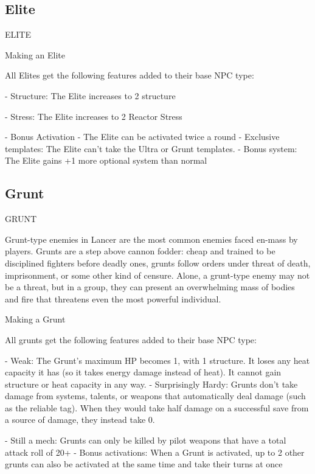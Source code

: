 \subsection{Elite}
                                                   ELITE  

Making an Elite
 
All Elites get the following features added to their base NPC type:
 
    -   Structure: The Elite increases to 2 structure
 
    -   Stress: The Elite increases to 2 Reactor Stress
 
    -    Bonus Activation - The Elite can be activated twice a round  
    -    Exclusive templates: The Elite can’t take the Ultra or Grunt templates.  
    -    Bonus system: The Elite gains +1 more optional system than normal  
\subsection{Grunt}
                                                 GRUNT   

Grunt-type enemies in Lancer are the most common enemies faced en-mass by players. Grunts  
are a step above cannon fodder: cheap and trained to be disciplined fighters before deadly ones,  
grunts follow orders under threat of death, imprisonment, or some other kind of censure. Alone, a  
grunt-type enemy may not be a threat, but in a group, they can present an overwhelming mass of  
bodies and fire that threatens even the most powerful individual.   

Making a Grunt
 
All grunts get the following features added to their base NPC type:
 
    -   Weak: The Grunt’s maximum HP becomes 1, with 1 structure. It loses any heat capacity it  
         has (so it takes energy damage instead of heat). It cannot gain structure or heat capacity  
         in any way.  
    -   Surprisingly Hardy: Grunts don’t take damage from systems, talents, or weapons that  
        automatically deal damage (such as the reliable tag). When they would take half damage  
        on a successful save from a source of damage, they instead take 0.
 
    -   Still a mech: Grunts can only be killed by pilot weapons that have a total attack roll of  
        20+  
    -    Bonus activations: When a Grunt is activated, up to 2 other grunts can also be activated  
        at the same time and take their turns at once
 
